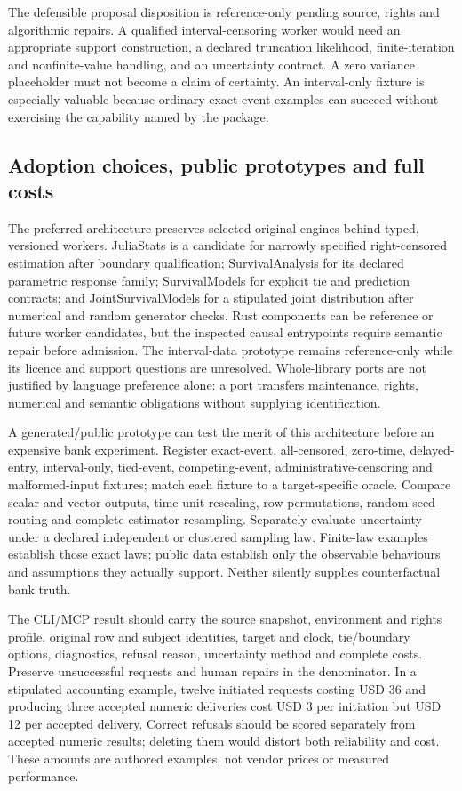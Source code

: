 The defensible proposal disposition is reference-only pending source, rights and
algorithmic repairs. A qualified interval-censoring worker would need an appropriate
support construction, a declared truncation likelihood, finite-iteration and
nonfinite-value handling, and an uncertainty contract. A zero variance placeholder
must not become a claim of certainty. An interval-only fixture is especially valuable
because ordinary exact-event examples can succeed without exercising the capability
named by the package.

\subsection{Adoption choices, public prototypes and full costs}
The preferred architecture preserves selected original engines behind typed,
versioned workers. JuliaStats is a candidate for narrowly specified right-censored
estimation after boundary qualification; SurvivalAnalysis for its declared parametric
response family; SurvivalModels for explicit tie and prediction contracts; and
JointSurvivalModels for a stipulated joint distribution after numerical and random
generator checks. Rust components can be reference or future worker candidates,
but the inspected causal entrypoints require semantic repair before admission.
The interval-data prototype remains reference-only while its licence and support
questions are unresolved. Whole-library ports are not justified by language
preference alone: a port transfers maintenance, rights, numerical and semantic
obligations without supplying identification.

A generated/public prototype can test the merit of this architecture before an
expensive bank experiment. Register exact-event, all-censored, zero-time, delayed-entry,
interval-only, tied-event, competing-event, administrative-censoring and malformed-input
fixtures; match each fixture to a target-specific oracle. Compare scalar and vector
outputs, time-unit rescaling, row permutations, random-seed routing and complete
estimator resampling. Separately evaluate uncertainty under a declared independent
or clustered sampling law. Finite-law examples establish those exact laws; public
data establish only the observable behaviours and assumptions they actually support.
Neither silently supplies counterfactual bank truth.

The CLI/MCP result should carry the source snapshot, environment and rights profile,
original row and subject identities, target and clock, tie/boundary options, diagnostics,
refusal reason, uncertainty method and complete costs. Preserve unsuccessful requests
and human repairs in the denominator. In a stipulated accounting example, twelve
initiated requests costing USD 36 and producing three accepted numeric deliveries
cost USD 3 per initiation but USD 12 per accepted delivery. Correct refusals should
be scored separately from accepted numeric results; deleting them would distort
both reliability and cost. These amounts are authored examples, not vendor prices
or measured performance.~\citep{exec24_survivalother_reference}


